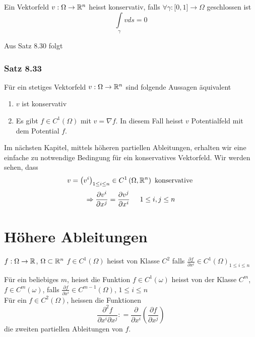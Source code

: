 \begin{definition}{8.32}
Ein Vektorfeld $v:\Omega\to\mathbb{R}^n$ heisst konservativ, falls $\forall\gamma:\lbrack 0,1\rbrack\to\Omega$ geschlossen ist \[\int\limits_\gamma v ds=0\]
\end{definition}
Aus Satz 8.30 folgt
\subsubsection*{Satz 8.33}
Für ein stetiges Vektorfeld $v:\Omega\to\mathbb{R}^n$ sind folgende Aussagen äquivalent
\begin{enumerate}
\item $v$ ist konservativ
\item Es gibt $f\in C^1\left( \Omega\right)$ mit $v=\nabla f$. In diesem Fall heisst $v$ Potentialfeld mit dem Potential $f$.
\end{enumerate}

Im nächsten Kapitel, mittels höheren partiellen Ableitungen, erhalten wir eine einfache zu  notwendige Bedingung für ein konservatives Vektorfeld. Wir werden sehen, dass
\[v = {\left( {{v^i}} \right)_{1 \le i \le n}} \in C^1\left( {\Omega ,\mathbb{R}^n} \right)\text{ konservative }\]
\[\Rightarrow \frac{\partial v^i}{\partial x^j}=\frac{\partial v^j}{\partial x^i}\hspace{5mm}1\leq i,j\leq n\]

\section{Höhere Ableitungen}
\begin{definition}{8.44}
$f:\Omega\to\mathbb{R}$, $\Omega\subset\mathbb{R}^n$ $f\in C^1\left( \Omega\right)$ heisst von Klasse $C^2$ falls $\frac{\partial f}{\partial x^i}\in C^1{\left( \Omega\right)}_{1\leq i\leq n}$
\end{definition}
Für ein beliebiges $m$, heisst die Funktion $f\in C^1\left( \omega\right)$ heisst von der Klasse $C^m$, $f\in C^m\left( \omega\right)$, falls $\frac{\partial f}{\partial x^i}\in C^{m-1}\left( \Omega\right)$, $1\leq i\leq n$\\

Für ein $f\in C^2\left( \Omega\right)$, heissen die Funktionen \[\frac{{{\partial ^2}f}}{{\partial {x^i}\partial {x^j}}}: = \frac{\partial }{{\partial {x^i}}}\left( {\frac{{\partial f}}{{\partial {x^j}}}} \right)\] die zweiten partiellen Ableitungen von $f$.\\

